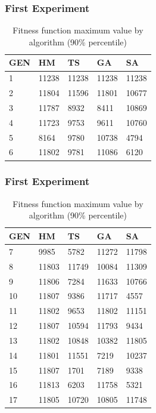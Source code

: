 \documentclass{beamer}
\begin{document}
\begin{frame}[allowframebreaks]
\frametitle{First Experiment}
\begin{table}[h]
\centering
\caption{Fitness function maximum value by algorithm (90\% percentile)}
\label{tab:averagefirst}
\begin{tabular}{|l|l|l|l|l|}
\hline
GEN & HM & TS  & GA    & SA    \\ \hline
1          & 11238 & 11238         & 11238 & 11238 \\ \hline
2          & 11804 & 11596         & 11801 & 10677 \\ \hline
3          & 11787 & 8932          & 8411  & 10869 \\ \hline
4          & 11723 & 9753          & 9611  & 10760 \\ \hline
5          & 8164  & 9780          & 10738 & 4794  \\ \hline
6          & 11802 & 9781          & 11086 & 6120  \\ \hline
\end{tabular}
\end{table}
\end{frame}


\begin{frame}[allowframebreaks]
\frametitle{First Experiment}
\begin{table}[h]
\centering
\caption{Fitness function maximum value by algorithm (90\% percentile)}
\label{tab:averagefirst}
\begin{tabular}{|l|l|l|l|l|}
\hline
GEN & HM & TS  & GA    & SA    \\ \hline
7          & 9985  & 5782          & 11272 & 11798 \\ \hline
8          & 11803 & 11749         & 10084 & 11309 \\ \hline
9          & 11806 & 7284          & 11633 & 10766 \\ \hline
10         & 11807 & 9386          & 11717 & 4557  \\ \hline
11         & 11802 & 9653          & 11802 & 11151 \\ \hline
12         & 11807 & 10594         & 11793 & 9434  \\ \hline
13         & 11802 & 10848         & 10382 & 11805 \\ \hline
14         & 11801 & 11551         & 7219  & 10237 \\ \hline
15         & 11807 & 1701          & 7189  & 9338  \\ \hline
16         & 11813 & 6203          & 11758 & 5321  \\ \hline
17         & 11805 & 10720         & 10805 & 11748 \\ \hline
\end{tabular}
\end{table}
\end{frame}
\end{document}
